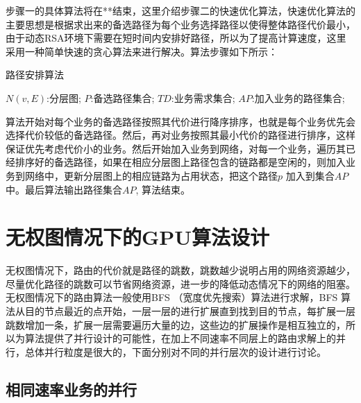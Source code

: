 步骤一的具体算法将在**结束，这里介绍步骤二的快速优化算法，快速优化算法的主要思想是根据求出来的备选路径为每个业务选择路径以使得整体路径代价最小，由于动态RSA环境下需要在短时间内安排好路径，所以为了提高计算速度，这里采用一种简单快速的贪心算法来进行解决。算法步骤如下所示：
\begin{algorithm}[htb]
\caption{路径安排算法}
\label{arrange}
\begin{algorithmic}[1]
\Require
$N(v,E)$:分层图;
$P$:备选路径集合;
$TD$:业务需求集合;
\Ensure
$AP$:加入业务的路径集合;
\EndFor
{}
\EndIf
\EndFor
\EndFor
\end{algorithmic}
\end{algorithm}

算法开始对每个业务的备选路径按照其代价进行降序排序，也就是每个业务优先会选择代价较低的备选路径。然后，再对业务按照其最小代价的路径进行排序，这样保证优先考虑代价小的业务。然后开始加入业务到网络，对每一个业务，遍历其已经排序好的备选路径，如果在相应分层图上路径包含的链路都是空闲的，则加入业务到网络中，更新分层图上的相应链路为占用状态，把这个路径$p$ 加入到集合$AP$ 中。最后算法输出路径集合$AP$, 算法结束。
\section{无权图情况下的GPU算法设计}

无权图情况下，路由的代价就是路径的跳数，跳数越少说明占用的网络资源越少，尽量优化路径的跳数可以节省网络资源，进一步的降低动态情况下的网络的阻塞。无权图情况下的路由算法一般使用BFS （宽度优先搜索）算法进行求解，BFS 算法从目的节点最近的点开始，一层一层的进行扩展直到找到目的节点，每扩展一层跳数增加一条，扩展一层需要遍历大量的边，这些边的扩展操作是相互独立的，所以为算法提供了并行设计的可能性，在加上不同速率不同层上的路由求解上的并行，总体并行粒度是很大的，下面分别对不同的并行层次的设计进行讨论。
\subsection {相同速率业务的并行}

